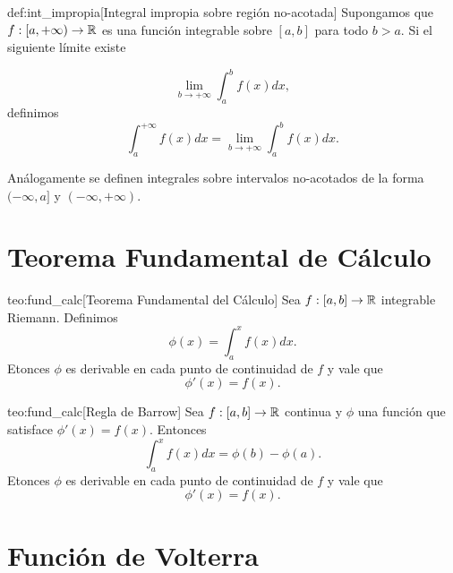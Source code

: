 \begin{definicion}{def:int_impropia}[Integral impropia sobre región no-acotada] Supongamos  que $f:[a,+\infty)\to\mathbb{R}$ es una función integrable sobre $[a,b]$  para todo $b>a$. Si el siguiente límite existe

\[
 \lim_{b\to +\infty}\int_a^bf(x)dx,
\]
definimos 
\begin{equation}\label{eq:int_impro_inf}
 \int_a^{+\infty}f(x)dx= \lim_{b\to +\infty}\int_a^bf(x)dx.
\end{equation}

\end{definicion}

Análogamente se definen integrales sobre intervalos no-acotados de la forma $(-\infty, a]$ y $(-\infty,+\infty)$.



\section{Teorema Fundamental de Cálculo}


\begin{teorema}{teo:fund_calc}[Teorema Fundamental del Cálculo]
 Sea $f:[a,b]\to\mathbb{R}$ integrable Riemann. Definimos
 \begin{equation*}\label{eq:primi1}
  \phi(x)=\int_a^{x}f(x)dx.
 \end{equation*}
Etonces $\phi$ es derivable en cada punto de continuidad de $f$ y vale que
 \begin{equation}\label{eq:primi2}
  \phi'(x)=f(x).
 \end{equation}
\end{teorema}


\begin{corolario}{teo:fund_calc}[Regla de Barrow]
 Sea $f:[a,b]\to\mathbb{R}$ continua y $\phi$ una función que satisface $\phi'(x)=f(x)$. Entonces
 \begin{equation}\label{eq:barrow}
  \int_a^{x}f(x)dx=\phi(b)-\phi(a).
 \end{equation}
Etonces $\phi$ es derivable en cada punto de continuidad de $f$ y vale que
 \begin{equation*}\label{eq:primi2}
  \phi'(x)=f(x).
 \end{equation*}
\end{corolario}


\section{Función de Volterra}

